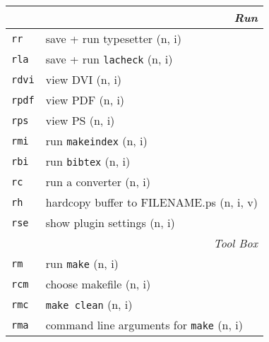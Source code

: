 \documentclass[oneside,10pt,landscape,DIV16]{scrartcl}
\newcommand{\Map}[1] {\textbf{\textasciiacute}\texttt{#1}}
\begin{document}
\begin{multicols}{3}
\begin{center}
\begin{tabular}[]{|p{11mm}|p{63mm}|}
\hline
\hline
\multicolumn{2}{|r|}{\textsl{\textbf{R}un}} \\[1.0ex]
\hline \Map{rr}   & save + run typesetter                    \hfill (n, i)\\
\hline \Map{rla}  & save + run \texttt{lacheck}              \hfill (n, i)\\
\hline \Map{rdvi} & view DVI                                 \hfill (n, i)\\
\hline \Map{rpdf} & view PDF                                 \hfill (n, i)\\
\hline \Map{rps}  & view PS                                  \hfill (n, i)\\
\hline
\hline \Map{rmi}  & run \texttt{makeindex}                   \hfill (n, i)\\
\hline \Map{rbi}  & run \texttt{bibtex}                      \hfill (n, i)\\
\hline \Map{rc}   & run a converter                          \hfill (n, i)\\
\hline \Map{rh}   & hardcopy buffer to \small{FILENAME}.ps   \hfill (n, i, v)\\
\hline \Map{rse}  & show plugin settings                     \hfill (n, i)\\
\hline
\hline
\multicolumn{2}{|r|}{\textsl{Tool Box}} \\[1.0ex]
\hline \Map{rm}  & run \texttt{make}                        \hfill (n, i)   \\
\hline \Map{rcm} & choose makefile                          \hfill (n, i)   \\
\hline \Map{rmc} & \texttt{make clean}                      \hfill (n, i)   \\
\hline \Map{rma} & command line arguments for \texttt{make} \hfill (n, i)   \\
\hline
\end{tabular}\\
%
%
\end{center}%
\end{multicols}%
%
\end{document}
